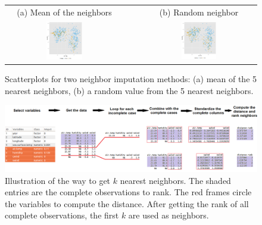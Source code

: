 \documentclass[article]{jss}
\begin{document}
\begin{center}
\begin{figure}[h]
\begin{centering}
\begin{tabular}{cccc}
{\tiny{(a) Mean of the neighbors}} &  &  & {\tiny{(b) Random neighbor}}\tabularnewline
\includegraphics[width=0.32\textwidth]{graph/fig3-5-knn} &  &  & \includegraphics[width=0.32\textwidth]{graph/fig3-5-knn-2}\tabularnewline
\end{tabular}
\par\end{centering}
\caption{Scatterplots for two neighbor imputation methods: (a) mean of the 5 nearest neighbors, (b) a random value from the 5 nearest neighbors.}
\label{fig:neighbor-imputation}
\end{figure}
\par\end{center}


\begin{center}
\begin{figure}[h]
\begin{centering}
\includegraphics[width=1\textwidth]{graph/fig9-diagram}
\par\end{centering}
\caption{Illustration of the way to get $k$ nearest neighbors. The shaded entries are the complete observations to rank. The red frames circle the variables to compute the distance. After getting the rank of all complete observations, the first $k$ are used as neighbors. }
\label{fig:neighbor-diagram}
\end{figure}
\par\end{center}
\end{document}
